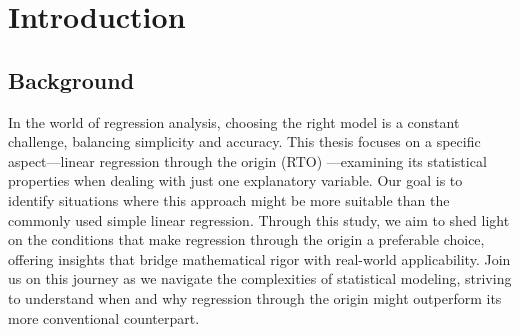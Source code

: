 \documentclass[12pt,a4paper,oneside]{book} %
\newcommand{\hsp}{\hspace{20pt}}
\begin{document}

	\frontmatter
	
	\setcounter{tocdepth}{1}
	\tableofcontents
	\listoffigures
		
	\mainmatter
	
	\pagestyle{plain}
	
	\titleformat{\chapter}[display]{\normalfont\huge\bfseries}{\chaptertitlename\ \thechapter}{20pt}{\Huge}
	\titlespacing*{\chapter}{10pt}{20pt}{40pt}
	 
	\titleformat{\chapter}[hang]{\Huge\bfseries}{\thechapter.\hsp}{0pt}{\Huge\bfseries} 
	  
	\chapter{Introduction}
	
	
	\section{Background}
	In the world of regression analysis, choosing the right model is a constant challenge, balancing simplicity and accuracy. This thesis focuses on a specific aspect—linear regression through the origin (RTO) —examining its statistical properties when dealing with just one explanatory variable. Our goal is to identify situations where this approach might be more suitable than the commonly used simple linear regression. Through this study, we aim to shed light on the conditions that make regression through the origin a preferable choice, offering insights that bridge mathematical rigor with real-world applicability. Join us on this journey as we navigate the complexities of statistical modeling, striving to understand when and why regression through the origin might outperform its more conventional counterpart.
\end{document}
